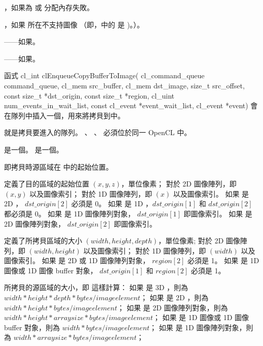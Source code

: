 \item {}，如果為  或  分配內存失敗。

\item {}，如果  所在不支持圖像
（即，中的  是 )。）。

\item {}——如果\scdevfailres。
\item {}——如果\schostfailres。
\stopigBase

函式
\startCLFUNC
cl_int clEnqueueCopyBufferToImage(
			cl_command_queue command_queue,
			cl_mem src_buffer,
			cl_mem dst_image,
			size_t src_offset,
			const size_t *dst_origin,
			const size_t *region,
			cl_uint num_events_in_wait_list,
			const cl_event *event_wait_list,
			cl_event *event)
\stopCLFUNC
會在隊列中插入一個，用來將拷貝到中。

 就是拷貝要進入的隊列。
、 、  必須位於同一 OpenCL 中。

 是一個。
 是一個。

 即拷貝時源區域在  中的起始位置。

 定義了目的區域的起始位置 $(x, y, z)$，單位像素；
對於 2D 圖像陣列，即 $(x, y)$ 以及圖像索引；
對於 1D 圖像陣列，即 $(x)$ 以及圖像索引。
如果  是 2D ， $dst\_origin[2]$ 必須是 0。
如果  是 1D ，$dst\_origin[1]$ 和 $dst\_origin[2]$ 都必須是 0。
如果  是 1D 圖像陣列對象， $dst\_origin[1]$ 即圖像索引。
如果  是 2D 圖像陣列對象， $dst\_origin[2]$ 即圖像索引。

 定義了所拷貝區域的大小 $(width, height, depth)$，單位像素;
對於 2D 圖像陣列，即 $(width, height)$ 以及圖像索引；
對於 1D 圖像陣列，即 $(width)$ 以及圖像索引。
如果  是 2D  或 1D 圖像陣列對象， $region[2]$ 必須是 1。
如果  是 1D 圖像或 1D 圖像 buffer 對象， $dst\_origin[1]$ 和 $region[2]$ 必須是 1。

所拷貝的源區域的大小，即  這樣計算：
如果  是 3D ，則為 $width * height * depth * bytes/image element$；
如果  是 2D ，則為 $width * height * bytes/image element$；
如果  是 2D 圖像陣列對象，則為 $width * height * arraysize * bytes/image element$；
如果  是 1D 圖像或 1D 圖像 buffer 對象，則為 $width * bytes/image element$；
如果  是 1D 圖像陣列對象，則為 $width * arraysize * bytes/image element$；

